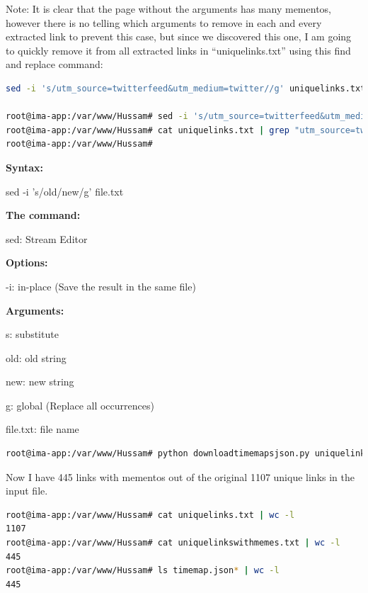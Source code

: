 \documentclass[a4paper, 11pt]{article}
\begin{document}
Note: It is clear that the page without the arguments has many mementos, however there is no telling which arguments to remove in each and every extracted link to prevent this case, but since we discovered this one, I am going to quickly remove it from all extracted links in ``uniquelinks.txt'' using this find and replace command:
\begin{lstlisting}[language=bash, breakatwhitespace=〈false), label=Command, caption=Command: Removing GET arguments]
sed -i 's/utm_source=twitterfeed&utm_medium=twitter//g' uniquelinks.txt

root@ima-app:/var/www/Hussam# sed -i 's/utm_source=twitterfeed&utm_medium=twitter//g' uniquelinks.txt
root@ima-app:/var/www/Hussam# cat uniquelinks.txt | grep "utm_source=twitterfeed&utm_medium=twitter"
root@ima-app:/var/www/Hussam#
\end{lstlisting}

\textbf{Syntax:}

sed -i 's/old/new/g' file.txt

\textbf{The command:}

sed: Stream Editor

\textbf{Options:}

-i: in-place (Save the result in the same file)

\textbf{Arguments:}

s: substitute

old: old string

new: new string

g: global (Replace all occurrences)

file.txt: file name



\begin{lstlisting}[language=bash, breakatwhitespace=〈false), label=Command, caption=Running downloadtimemapsjson.py]
root@ima-app:/var/www/Hussam# python downloadtimemapsjson.py uniquelinks.txt timemap.json uniquelinkswithmemes.txt
\end{lstlisting}

Now I have 445 links with mementos out of the original 1107 unique links in the input file.

\begin{lstlisting}[language=bash, breakatwhitespace=〈false), label=Command, caption=Links with mementos:]
root@ima-app:/var/www/Hussam# cat uniquelinks.txt | wc -l
1107
root@ima-app:/var/www/Hussam# cat uniquelinkswithmemes.txt | wc -l
445
root@ima-app:/var/www/Hussam# ls timemap.json* | wc -l
445
\end{lstlisting}
\end{document}
